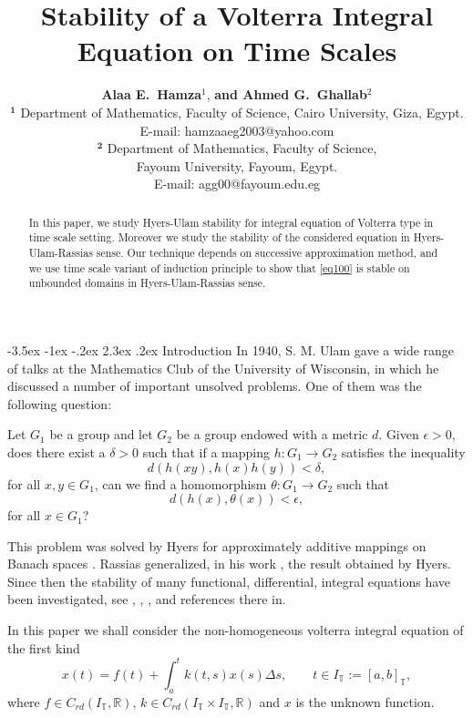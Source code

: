 \documentclass{article}
\title{\textbf{Stability of a Volterra Integral Equation on Time Scales}}
\author{\small \textbf{Alaa E.\ Hamza$^{1}$}, \textbf{and Ahmed G.~Ghallab$^{2}$}  \\
\small$^\textbf{{1}}$ Department of Mathematics, Faculty of Science, Cairo University, Giza, Egypt.\\
\small E-mail: hamzaaeg2003@yahoo.com\\
\small$^\textbf{{2}}$ Department of Mathematics, Faculty of  Science,\\
 \small {Fayoum University, Fayoum, Egypt.}\\
 \small E-mail: agg00@fayoum.edu.eg}
\date{}
\makeatletter
\renewcommand\section{\@startsection {section}{1}{\z@}%
                                   {-3.5ex \@plus -1ex \@minus -.2ex}%
                                   {2.3ex \@plus.2ex}%
                                   {\normalfont\Large\bfseries
                                    \setcounter{equation}{0}
                                    \setcounter{thm}{0}}}
\newcommand{\qq}{\qquad}
\makeatother
\begin{document}
 \thispagestyle{empty} \maketitle
 \begin{abstract}
 In this paper, we study Hyers-Ulam stability for integral equation of Volterra type in time scale setting. Moreover we study the stability of the considered equation in Hyers-Ulam-Rassias sense. Our technique depends on successive approximation method, and we use time scale variant of induction principle to show that \eqref{eq100} is stable on unbounded domains in Hyers-Ulam-Rassias sense.
 \end{abstract}
 \section{Introduction}
In 1940, S. M. Ulam gave a wide range of talks at the Mathematics Club of
the University of Wisconsin, in which he discussed a number of important unsolved
problems. One of them was the following question:

Let $G_1$ be a group and let $G_2$ be a group endowed with a metric $d$. Given $\epsilon > 0$, does there exist a $\delta > 0$ such that if a mapping $h:G_1\rightarrow G_2 $ satisfies the inequality
$$
d(h(xy),h(x)h(y))<\delta,
$$
for all $x,y\in G_1$, can we find a homomorphism $\theta:G_1\rightarrow G_2$ such that
$$
d(h(x),\theta(x))< \epsilon,
$$
for all $x\in G_1$?

This problem was solved by Hyers for approximately additive mappings on Banach spaces \cite{hyers}. Rassias generalized, in his work \cite{rass}, the result obtained by Hyers. Since then the stability of many functional, differential, integral equations have been investigated, see \cite{gach}, \cite{andras}, \cite{jung}, and references there in.

In this paper we shall consider the non-homogeneous volterra integral equation of the first kind
\begin{equation}\label{eq100}
  x(t)=f(t)+\int_a^tk(t,s)x(s)\Delta s, \qq t\in I_\mathbb{T}:=[a,b]_\mathbb{T},
\end{equation}
where $f\in C_{rd}(I_\mathbb{T},\mathbb{R})$, $k\in C_{rd}(I_\mathbb{T}\times I_\mathbb{T},\mathbb{R})$ and $x$ is the unknown function.
\end{document}
